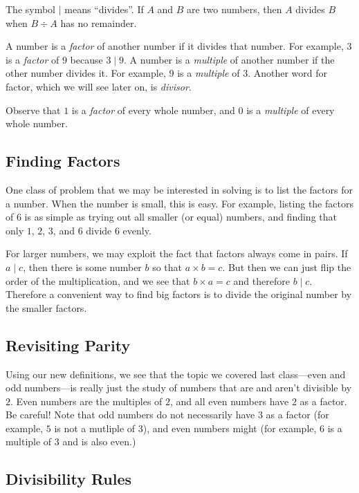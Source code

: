\documentclass[a4paper,10pt]{report}
\begin{document}
The symbol $\mid$ means ``divides''. If $A$ and $B$ are two numbers, then $A$
divides $B$ when $B \div A$ has no remainder.

A number is a \emph{factor} of another number if it divides that number. For
example, $3$ is a \emph{factor} of $9$ because $3 \mid 9$. A number is a
\emph{multiple} of another number if the other number divides it. For example,
$9$ is a \emph{multiple} of $3$. Another word for factor, which we will see
later on, is \emph{divisor}.

Observe that $1$ is a \emph{factor} of every whole number, and $0$ is a
\emph{multiple} of every whole number.

\subsection{Finding Factors}

One class of problem that we may be interested in solving is to list the factors
for a number. When the number is small, this is easy. For example, listing the
factors of $6$ is as simple as trying out all smaller (or equal) numbers, and
finding that only $1$, $2$, $3$, and $6$ divide $6$ evenly.

For larger numbers, we may exploit the fact that factors always come in pairs.
If $a \mid c$, then there is some number $b$ so that $a \times b = c$. But then
we can just flip the order of the multiplication, and we see that $b \times a =
c$ and therefore $b \mid c$. Therefore a convenient way to find big factors is
to divide the original number by the smaller factors.

\subsection{Revisiting Parity}

Using our new definitions, we see that the topic we covered last class---even
and odd numbers---is really just the study of numbers that are and aren't
divisible by $2$. Even numbers are the multiples of $2$, and all even numbers
have $2$ as a factor. Be careful! Note that odd numbers do not necessarily have
$3$ as a factor (for example, $5$ is not a mutliple of $3$), and even numbers
might (for example, $6$ is a multiple of $3$ and is also even.)

\subsection{Divisibility Rules}
\end{document}
